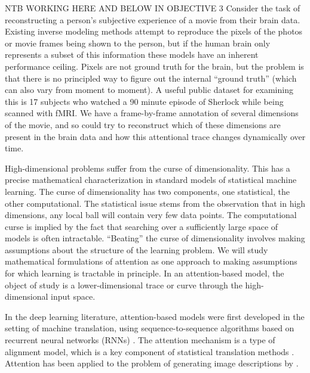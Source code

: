 NTB WORKING HERE AND BELOW IN OBJECTIVE 3
Consider the task of reconstructing a person's
subjective experience of a movie from their brain data. Existing
inverse modeling methods attempt to reproduce the pixels of the photos
or movie frames being shown to the person, but if the human brain only
represents a subset of this information these models have an inherent
performance ceiling. Pixels are not ground truth for the brain, but
the problem is that there is no principled way to figure out the
internal ``ground truth''  (which can also vary from moment to moment). A useful public dataset for examining this is 17 subjects who watched a 90 minute episode of Sherlock while being scanned with fMRI. We have a frame-by-frame annotation of several dimensions of the movie, and so could try to reconstruct which of these dimensions are present in the brain data and how this attentional trace changes dynamically over time.

\statbackground{} High-dimensional problems suffer from the curse of
dimensionality. This has a precise mathematical characterization in
standard models of statistical machine learning. The curse of
dimensionality has two components, one statistical, the other
computational. The statistical issue stems from the observation that
in high dimensions, any local ball will contain very few data
points. The computational curse is implied by the fact that searching
over a sufficiently large space of models is often
intractable. ``Beating'' the curse of dimensionality involves making
assumptions about the structure of the learning problem. We will study
mathematical formulations of attention as one approach to making
assumptions for which learning is tractable in principle.
In an attention-based model, the object of study is a
lower-dimensional trace or curve through the high-dimensional input
space. 

In the deep learning literature, attention-based models were first
developed in the setting of machine translation, using
sequence-to-sequence algorithms based on recurrent neural networks
(RNNs) \citep{bahdanau2014}. The attention mechanism is a type of alignment model,
which is a key component of statistical translation methods
\citep{Brown1993}. Attention has been applied to the problem of generating image
descriptions by \cite{showtell}.

